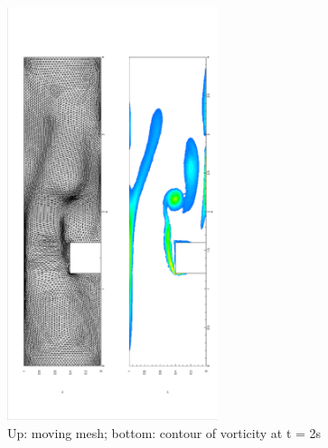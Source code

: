 \documentclass[a4paper, 11pt]{article}
\begin{document}
      \begin{figure}[!htbp]
        \centering
        \includegraphics[width = 0.55\textwidth, angle = -90]{picture/step_flow_data/mesh_t_2s.eps}
        \caption{\small Up: moving mesh; bottom: contour of vorticity
          at t = 2s}
        \label{fig::step_flow_2s}
      \end{figure}
\end{document}

